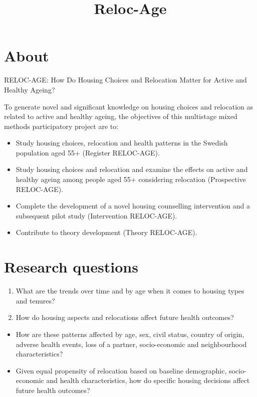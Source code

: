 \documentclass[
]{book}
\title{Reloc-Age}
\author{}
\date{\vspace{-2.5em}}
\providecommand{\tightlist}{%
  \setlength{\itemsep}{0pt}\setlength{\parskip}{0pt}}
\begin{document}
\maketitle

{
\setcounter{tocdepth}{1}
\tableofcontents
}
\hypertarget{about}{%
\chapter{About}\label{about}}

RELOC-AGE: How Do Housing Choices and Relocation Matter for Active and Healthy Ageing?

To generate novel and significant knowledge on housing choices and relocation as related to active and healthy ageing,
the objectives of this multistage mixed methods participatory project are to:

\begin{itemize}
\tightlist
\item
  Study housing choices, relocation and health patterns in the Swedish population aged 55+ (Register
  RELOC-AGE).
\item
  Study housing choices and relocation and examine the effects on active and healthy ageing among people
  aged 55+ considering relocation (Prospective RELOC-AGE).
\item
  Complete the development of a novel housing counselling intervention and a subsequent pilot study
  (Intervention RELOC-AGE).
\item
  Contribute to theory development (Theory RELOC-AGE).
\end{itemize}

\hypertarget{research-questions}{%
\chapter{Research questions}\label{research-questions}}

\begin{enumerate}
\def\labelenumi{\arabic{enumi}.}
\tightlist
\item
  What are the trends over time and by age when it comes to housing types and tenures?
\item
  How do housing aspects and relocations affect future health outcomes?
\end{enumerate}

\begin{itemize}
\tightlist
\item
  How are these patterns affected by age, sex, civil status, country of origin, adverse health
  events, loss of a partner, socio-economic and neighbourhood characteristics?
\item
  Given equal propensity of relocation based on baseline demographic, socio-economic and
  health characteristics, how do specific housing decisions affect future health outcomes?
\end{itemize}
\end{document}
